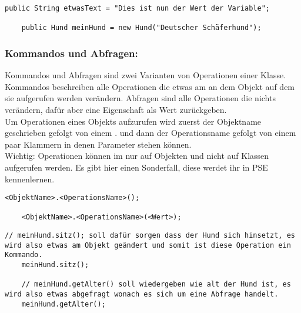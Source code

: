 \begin{lstlisting}[title=\textbf{Variable Beispiel}]
	public String etwasText = "Dies ist nun der Wert der Variable";
	
	public Hund meinHund = new Hund("Deutscher Schäferhund");
\end{lstlisting}
\begin{Infobox}
	\subsubsection*{Kommandos und Abfragen:}
	Kommandos und Abfragen sind zwei Varianten von Operationen einer Klasse. Kommandos beschreiben alle Operationen die etwas am an dem Objekt auf dem sie aufgerufen werden verändern.
	Abfragen sind alle Operationen die nichts verändern, dafür aber eine Eigenschaft als Wert zurückgeben.\\
	Um Operationen eines Objekts aufzurufen wird zuerst der Objektname geschrieben gefolgt von einem . und dann der Operationsname gefolgt von einem paar Klammern in denen Parameter stehen können.\\
	{\color{red} Wichtig: } Operationen können im nur auf Objekten und nicht auf Klassen aufgerufen werden.
	Es  gibt hier einen Sonderfall, diese werdet ihr in PSE kennenlernen.
\end{Infobox}
\begin{lstlisting}[title=\textbf{Kommando/Abfrage Syntax}]
	<ObjektName>.<OperationsName>();
	
	<ObjektName>.<OperationsName>(<Wert>);
\end{lstlisting}
\newpage
\begin{lstlisting}[title=\textbf{Kommando/Abfrage Beispiel}]
	// meinHund.sitz(); soll dafür sorgen dass der Hund sich hinsetzt, es wird also etwas am Objekt geändert und somit ist diese Operation ein Kommando.
	meinHund.sitz();
	
	// meinHund.getAlter() soll wiedergeben wie alt der Hund ist, es wird also etwas abgefragt wonach es sich um eine Abfrage handelt.
	meinHund.getAlter();
\end{lstlisting}
